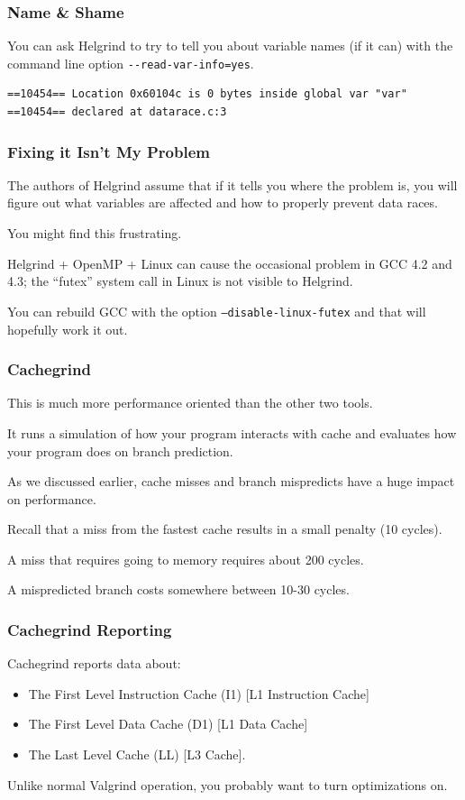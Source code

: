 \begin{frame}[fragile]
\frametitle{Name \& Shame}

You can ask Helgrind to try to tell you about variable names (if it can) with the command line option \verb+--read-var-info=yes+.

\begin{verbatim}
==10454== Location 0x60104c is 0 bytes inside global var "var"
==10454== declared at datarace.c:3
\end{verbatim}

\end{frame}

\begin{frame}
\frametitle{Fixing it Isn't My Problem}


The authors of Helgrind assume that if it tells you where the problem is, you will figure out what variables are affected and how to properly prevent data races. 

You might find this frustrating. 


Helgrind + OpenMP + Linux can cause the occasional problem in GCC 4.2 and 4.3; the ``futex'' system call in Linux is not visible to Helgrind. 

You can rebuild GCC with the option \texttt{--disable-linux-futex} and that will hopefully work it out.


\end{frame}

\begin{frame}
\frametitle{Cachegrind}

This is much more performance oriented than the other two tools. 

 It runs a simulation of how your program interacts with cache and evaluates how your program does on branch prediction.
 
 As we discussed earlier, cache misses and branch mispredicts have a huge impact on performance.
 
 Recall that a miss from the fastest cache results in a small penalty (10 cycles).
 
 A miss that requires going to memory requires about 200 cycles. 
 
 A mispredicted branch costs somewhere between 10-30 cycles.


\end{frame}

\begin{frame}
\frametitle{Cachegrind Reporting}

Cachegrind reports data about:
\begin{itemize}
	\item The First Level Instruction Cache (I1) [L1 Instruction Cache]
	\item The First Level Data Cache (D1) [L1 Data Cache]
	\item The Last Level Cache (LL) [L3 Cache].
\end{itemize}

Unlike normal Valgrind operation, you probably want to turn optimizations on.

\end{frame}


